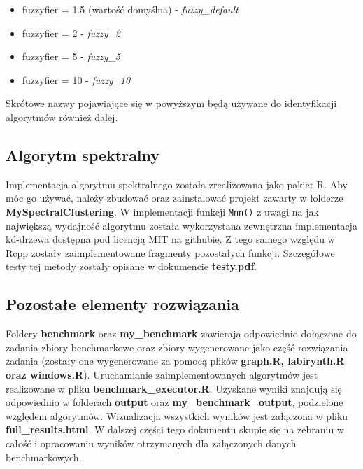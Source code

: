 \documentclass[]{article}
\providecommand{\tightlist}{%
  \setlength{\itemsep}{0pt}\setlength{\parskip}{0pt}}
\begin{document}
\begin{itemize}
  \begin{itemize}
  \tightlist
  \item
    fuzzyfier = 1.5 (wartość domyślna) - \emph{fuzzy\_default}
  \item
    fuzzyfier = 2 - \emph{fuzzy\_2}
  \item
    fuzzyfier = 5 - \emph{fuzzy\_5}
  \item
    fuzzyfier = 10 - \emph{fuzzy\_10}
  \end{itemize}
\end{itemize}

Skrótowe nazwy pojawiające się w powyższym będą używane do identyfikacji
algorytmów również dalej.

\subsection{Algorytm spektralny}\label{algorytm-spektralny}

Implementacja algorytmu spektralnego została zrealizowana jako pakiet R.
Aby móc go używać, należy zbudować oraz zainstalować projekt zawarty w
folderze \textbf{MySpectralClustering}. W implementacji funkcji
\texttt{Mnn()} z uwagi na jak największą wydajność algorytmu została
wykorzystana zewnętrzna implementacja kd-drzewa dostępna pod licencją
MIT na \href{https://github.com/gishi523/kd-tree}{githubie}. Z tego
samego względu w Rcpp zostały zaimplementowane fragmenty pozostałych
funkcji. Szczegółowe testy tej metody zostały opisane w dokumencie
\textbf{testy.pdf}.

\subsection{Pozostałe elementy
rozwiązania}\label{pozostae-elementy-rozwiazania}

Foldery \textbf{benchmark} oraz \textbf{my\_benchmark} zawierają
odpowiednio dołączone do zadania zbiory benchmarkowe oraz zbiory
wygenerowane jako część rozwiązania zadania (zostały one wygenerowane za
pomocą plików \textbf{graph.R, labirynth.R oraz windows.R}).
Uruchamianie zaimplementowanych algorytmów jest realizowane w pliku
\textbf{benchmark\_executor.R}. Uzyskane wyniki znajdują się odpowiednio
w folderach \textbf{output} oraz \textbf{my\_benchmark\_output},
podzielone względem algorytmów. Wizualizacja wszystkich wyników jest
załączona w pliku \textbf{full\_results.html}. W dalszej części tego
dokumentu skupię się na zebraniu w całość i opracowaniu wyników
otrzymanych dla załączonych danych benchmarkowych.
\end{document}
